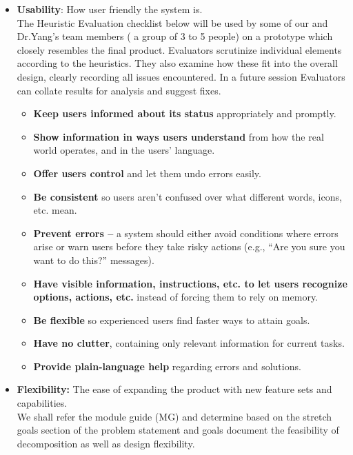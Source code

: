 \documentclass[12pt, titlepage]{article}
\begin{document}
\begin{itemize}
\item \textbf{Usability}: How user friendly the system is. \\
The Heuristic Evaluation checklist below will be used by some of our and Dr.Yang’s team members ( a group of 3 to 5 people) on a prototype which closely resembles the final product. Evaluators scrutinize individual elements according to the heuristics. They also examine how these fit into the overall design, clearly recording all issues encountered. In a future session Evaluators can collate results for analysis and suggest fixes.
    \begin{itemize}
    \item \textbf{Keep users informed about its status} appropriately and promptly. 
    \item\textbf{Show information in ways users understand } from how the real world operates, and in the users’ language.
    \item\textbf{Offer users control} and let them undo errors easily.
    \item\textbf{Be consistent} so users aren’t confused over what different words, icons, etc. mean.
    \item\textbf{Prevent errors –} a system should either avoid conditions where errors arise or warn users before they take risky actions (e.g., “Are you sure you want to do this?” messages).
    \item\textbf{Have visible information, instructions, etc. to let users recognize options, actions, etc.} instead of forcing them to rely on memory.
    \item\textbf{Be flexible } so experienced users find faster ways to attain goals.
    \item\textbf{Have no clutter}, containing only relevant information for current tasks.
    \item\textbf{Provide plain-language help} regarding errors and solutions.\\
    \end{itemize}
\item\textbf{Flexibility:} The ease of expanding the product with new feature sets and capabilities.\\
We shall refer the module guide (MG) and determine based on the stretch goals section of the problem statement and goals document the feasibility of decomposition as well as design flexibility.

\end{itemize}
\end{document}
